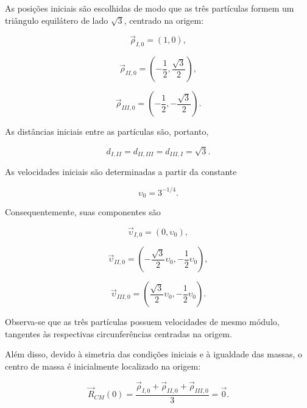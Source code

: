 \documentclass[12pt,a4paper]{article}
\begin{document}
As posições iniciais são escolhidas de modo que as três partículas formem um triângulo equilátero de lado $\sqrt{3}$, centrado na origem:

\begin{equation}
    \vec{\rho}_{I,0}=(1,0),
\end{equation}

\begin{equation}
    \vec{\rho}_{II,0}=
    \left(-\frac{1}{2},\frac{\sqrt{3}}{2}\right),
\end{equation}

\begin{equation}
    \vec{\rho}_{III,0}=
    \left(-\frac{1}{2},-\frac{\sqrt{3}}{2}\right).
\end{equation}

As distâncias iniciais entre as partículas são, portanto,

\begin{equation}
    d_{I,II}=d_{II,III}=d_{III,I}=\sqrt{3}.
\end{equation}

As velocidades iniciais são determinadas a partir da constante

\begin{equation}
    \upsilon_0=3^{-1/4}.
\end{equation}

Consequentemente, suas componentes são

\begin{equation}
    \vec{\upsilon}_{I,0}=(0,\upsilon_0),
\end{equation}

\begin{equation}
    \vec{\upsilon}_{II,0}=
    \left(
    -\frac{\sqrt{3}}{2}\upsilon_0,
    -\frac{1}{2}\upsilon_0
    \right),
\end{equation}

\begin{equation}
    \vec{\upsilon}_{III,0}=
    \left(
    \frac{\sqrt{3}}{2}\upsilon_0,
    -\frac{1}{2}\upsilon_0
    \right).
\end{equation}

Observa-se que as três partículas possuem velocidades de mesmo módulo, tangentes às respectivas circunferências centradas na origem.

Além disso, devido à simetria das condições iniciais e à igualdade das massas, o centro de massa é inicialmente localizado na origem:

\begin{equation}
    \vec{R}_{CM}(0)
    =
    \frac{
    \vec{\rho}_{I,0}
    +\vec{\rho}_{II,0}
    +\vec{\rho}_{III,0}
    }{3}
    =\vec{0}.
\end{equation}
\end{document}
